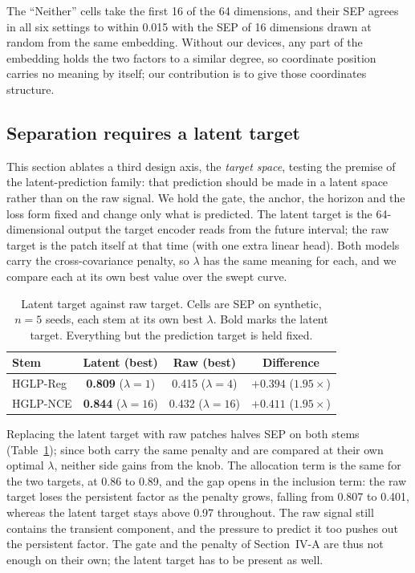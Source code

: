 The ``Neither'' cells take the first 16 of the 64 dimensions, and their SEP agrees in all six settings to within 0.015 with the SEP of 16 dimensions drawn at random from the same embedding. Without our devices, any part of the embedding holds the two factors to a similar degree, so coordinate position carries no meaning by itself; our contribution is to give those coordinates structure.

\subsection{Separation requires a latent target}

This section ablates a third design axis, the \emph{target space}, testing the premise of the latent-prediction family: that prediction should be made in a latent space rather than on the raw signal. We hold the gate, the anchor, the horizon and the loss form fixed and change only what is predicted. The latent target is the 64-dimensional output the target encoder reads from the future interval; the raw target is the patch itself at that time (with one extra linear head). Both models carry the cross-covariance penalty, so $\lambda$ has the same meaning for each, and we compare each at its own best value over the swept curve.

\begin{table}[!tbp]
\caption{Latent target against raw target. Cells are SEP on synthetic, $n=5$ seeds, each stem at its own best $\lambda$. Bold marks the latent target. Everything but the prediction target is held fixed.}
\label{tab:latentraw}
\centering
\footnotesize
\begin{tabular}{lccc}
\hline
Stem & Latent (best) & Raw (best) & Difference \\
\hline
HGLP-Reg & \textbf{0.809} ($\lambda=1$) & 0.415 ($\lambda=4$) & $+0.394$ ($1.95\times$) \\
HGLP-NCE & \textbf{0.844} ($\lambda=16$) & 0.432 ($\lambda=16$) & $+0.411$ ($1.95\times$) \\
\hline
\end{tabular}
\end{table}



Replacing the latent target with raw patches halves SEP on both stems (Table~\ref{tab:latentraw}); since both carry the same penalty and are compared at their own optimal $\lambda$, neither side gains from the knob. The allocation term is the same for the two targets, at 0.86 to 0.89, and the gap opens in the inclusion term: the raw target loses the persistent factor as the penalty grows, falling from 0.807 to 0.401, whereas the latent target stays above 0.97 throughout. The raw signal still contains the transient component, and the pressure to predict it too pushes out the persistent factor. The gate and the penalty of Section~IV-A are thus not enough on their own; the latent target has to be present as well.

